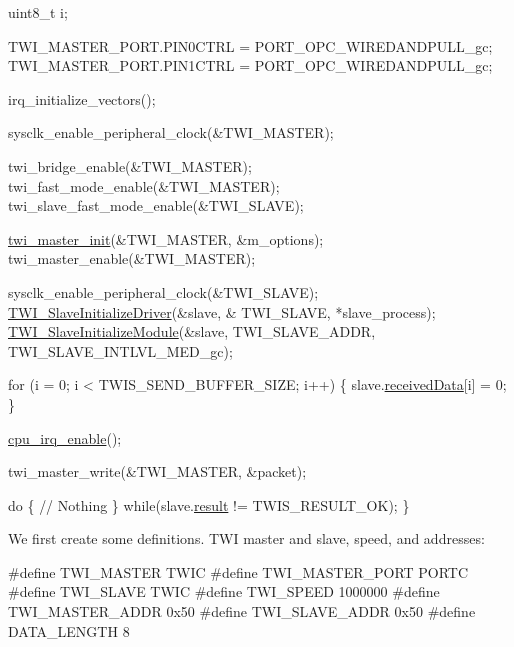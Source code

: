 \begin{DoxyCode}
             uint8\_t i;

             TWI\_MASTER\_PORT.PIN0CTRL = PORT\_OPC\_WIREDANDPULL\_gc;
             TWI\_MASTER\_PORT.PIN1CTRL = PORT\_OPC\_WIREDANDPULL\_gc;

             irq\_initialize\_vectors();

             sysclk\_enable\_peripheral\_clock(&TWI\_MASTER);

             twi\_bridge\_enable(&TWI\_MASTER);
             twi\_fast\_mode\_enable(&TWI\_MASTER);
             twi\_slave\_fast\_mode\_enable(&TWI\_SLAVE);

             \hyperlink{group__group__xmega__drivers__twi__twim_ga8029a07f3322bf43c289f5acb442ef29}{twi\_master\_init}(&TWI\_MASTER, &m\_options);
             twi\_master\_enable(&TWI\_MASTER);

             sysclk\_enable\_peripheral\_clock(&TWI\_SLAVE);
             \hyperlink{group__group__xmega__drivers__twi__twis_ga14b9327d32373a2481e23bec041cbd7e}{TWI\_SlaveInitializeDriver}(&slave, &
      TWI\_SLAVE, *slave\_process);
             \hyperlink{group__group__xmega__drivers__twi__twis_ga7516e604cb0aacddd8d1016a54039752}{TWI\_SlaveInitializeModule}(&slave, 
      TWI\_SLAVE\_ADDR,
                     TWI\_SLAVE\_INTLVL\_MED\_gc);

             \textcolor{keywordflow}{for} (i = 0; i < TWIS\_SEND\_BUFFER\_SIZE; i++) \{
                 slave.\hyperlink{struct_t_w_i___slave_a8c205728fdea8bcaeaa0f6f889d83d4d}{receivedData}[i] = 0;
             \}

             \hyperlink{group__interrupt__group_gae4922a4bd8ba4150211fbc7f2302403c}{cpu\_irq\_enable}();

             twi\_master\_write(&TWI\_MASTER, &packet);

             \textcolor{keywordflow}{do} \{
                 \textcolor{comment}{// Nothing}
             \} \textcolor{keywordflow}{while}(slave.\hyperlink{struct_t_w_i___slave_a38f52b1274d890275ae25f68d289c8d8}{result} != TWIS\_RESULT\_OK);
         \}
\end{DoxyCode}


We first create some definitions. T\-W\-I master and slave, speed, and addresses\-: 
\begin{DoxyCode}
\textcolor{preprocessor}{         #define TWI\_MASTER       TWIC}
\textcolor{preprocessor}{}\textcolor{preprocessor}{         #define TWI\_MASTER\_PORT  PORTC}
\textcolor{preprocessor}{}\textcolor{preprocessor}{         #define TWI\_SLAVE        TWIC}
\textcolor{preprocessor}{}\textcolor{preprocessor}{         #define TWI\_SPEED        1000000}
\textcolor{preprocessor}{}\textcolor{preprocessor}{         #define TWI\_MASTER\_ADDR  0x50}
\textcolor{preprocessor}{}\textcolor{preprocessor}{         #define TWI\_SLAVE\_ADDR   0x50}
\textcolor{preprocessor}{}
\textcolor{preprocessor}{         #define DATA\_LENGTH     8}
\end{DoxyCode}


